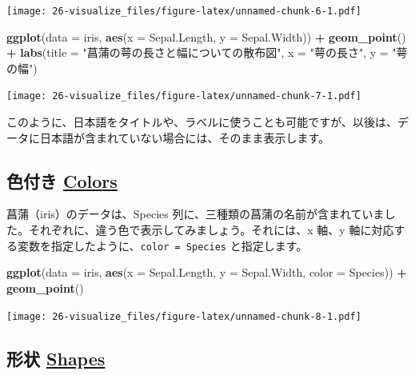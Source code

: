 \documentclass[
  xelatex, ja=standard]{bxjsbook}
\newenvironment{Shaded}{\begin{snugshade}}{\end{snugshade}}
\newcommand{\AttributeTok}[1]{\textcolor[rgb]{0.13,0.29,0.53}{#1}}
\newcommand{\FunctionTok}[1]{\textcolor[rgb]{0.13,0.29,0.53}{\textbf{#1}}}
\newcommand{\NormalTok}[1]{#1}
\newcommand{\SpecialCharTok}[1]{\textcolor[rgb]{0.81,0.36,0.00}{\textbf{#1}}}
\newcommand{\StringTok}[1]{\textcolor[rgb]{0.31,0.60,0.02}{#1}}
\theoremstyle{definition}
\theoremstyle{definition}
\theoremstyle{definition}
\theoremstyle{definition}
\theoremstyle{remark}
\begin{document}
\texttt{[image: 26-visualize\_files/figure-latex/unnamed-chunk-6-1.pdf]}

\begin{Shaded}
\begin{Highlighting}[]
\FunctionTok{ggplot}\NormalTok{(}\AttributeTok{data =}\NormalTok{ iris, }\FunctionTok{aes}\NormalTok{(}\AttributeTok{x =}\NormalTok{ Sepal.Length, }\AttributeTok{y =}\NormalTok{ Sepal.Width)) }\SpecialCharTok{+}
  \FunctionTok{geom\_point}\NormalTok{() }\SpecialCharTok{+} 
  \FunctionTok{labs}\NormalTok{(}\AttributeTok{title =} \StringTok{"菖蒲の萼の長さと幅についての散布図"}\NormalTok{, }\AttributeTok{x =} \StringTok{"萼の長さ"}\NormalTok{, }\AttributeTok{y =} \StringTok{"萼の幅"}\NormalTok{)}
\end{Highlighting}
\end{Shaded}

\texttt{[image: 26-visualize\_files/figure-latex/unnamed-chunk-7-1.pdf]}

このように、日本語をタイトルや、ラベルに使うことも可能ですが、以後は、データに日本語が含まれていない場合には、そのまま表示します。

\hypertarget{ux8272ux4ed8ux304d-colors}{%
\subsection{\texorpdfstring{色付き \href{https://ggplot2.tidyverse.org/reference/aes_colour_fill_alpha.html}{Colors}}{色付き Colors}}\label{ux8272ux4ed8ux304d-colors}}

菖蒲（iris）のデータは、Species 列に、三種類の菖蒲の名前が含まれていました。それぞれに、違う色で表示してみましょう。それには、x 軸、y 軸に対応する変数を指定したように、\texttt{color\ =\ Species} と指定します。

\begin{Shaded}
\begin{Highlighting}[]
\FunctionTok{ggplot}\NormalTok{(}\AttributeTok{data =}\NormalTok{ iris, }\FunctionTok{aes}\NormalTok{(}\AttributeTok{x =}\NormalTok{ Sepal.Length, }\AttributeTok{y =}\NormalTok{ Sepal.Width, }\AttributeTok{color =}\NormalTok{ Species)) }\SpecialCharTok{+}
  \FunctionTok{geom\_point}\NormalTok{()}
\end{Highlighting}
\end{Shaded}

\texttt{[image: 26-visualize\_files/figure-latex/unnamed-chunk-8-1.pdf]}

\hypertarget{ux5f62ux72b6-shapes}{%
\subsection{\texorpdfstring{形状 \href{https://ggplot2.tidyverse.org/articles/ggplot2-specs.html}{Shapes}}{形状 Shapes}}\label{ux5f62ux72b6-shapes}}
\end{document}
